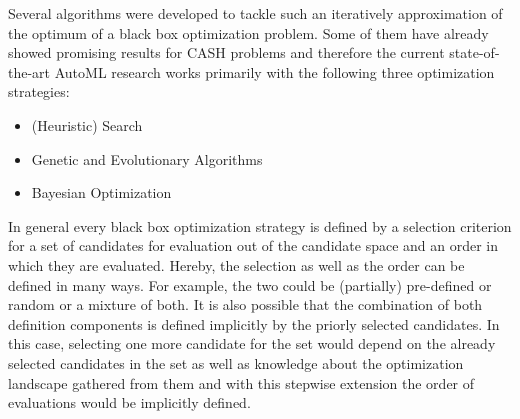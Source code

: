 Several algorithms were developed to tackle such an iteratively approximation of the optimum of a black box optimization problem.
Some of them have already showed promising results for CASH problems and therefore the current state-of-the-art AutoML research works primarily with the following three optimization strategies:
\begin{itemize}
    \item (Heuristic) Search
    \item Genetic and Evolutionary Algorithms
    \item Bayesian Optimization
\end{itemize}
In general every black box optimization strategy is defined by a selection criterion for a set of candidates for evaluation out of the candidate space and an order in which they are evaluated.
Hereby, the selection as well as the order can be defined in many ways.
For example, the two could be (partially) pre-defined or random or a mixture of both.
It is also possible that the combination of both definition components is defined implicitly by the priorly selected candidates.
In this case, selecting one more candidate for the set would depend on the already selected candidates in the set as well as knowledge about the optimization landscape gathered from them and with this stepwise extension the order of evaluations would be implicitly defined.

